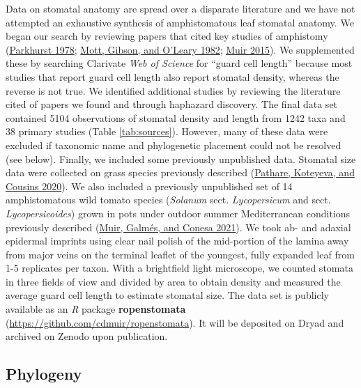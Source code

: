 \documentclass[
  10pt,
]{article}
\begin{document}
Data on stomatal anatomy are spread over a disparate literature and we have not attempted an exhaustive synthesis of amphistomatous leaf stomatal anatomy. We began our search by reviewing papers that cited key studies of amphistomy (\protect\hyperlink{ref-parkhurst_adaptive_1978}{Parkhurst 1978}; \protect\hyperlink{ref-mott_adaptive_1982}{Mott, Gibson, and O'Leary 1982}; \protect\hyperlink{ref-muir_making_2015}{Muir 2015}). We supplemented these by searching Clarivate \emph{Web of Science} for ``guard cell length'' because most studies that report guard cell length also report stomatal density, whereas the reverse is not true. We identified additional studies by reviewing the literature cited of papers we found and through haphazard discovery. The final data set contained 5104 observations of stomatal density and length from 1242 taxa and 38 primary studies (Table \ref{tab:sources}). However, many of these data were excluded if taxonomic name and phylogenetic placement could not be resolved (see below). Finally, we included some previously unpublished data. Stomatal size data were collected on grass species previously described (\protect\hyperlink{ref-pathare_increased_2020}{Pathare, Koteyeva, and Cousins 2020}). We also included a previously unpublished set of 14 amphistomatous wild tomato species (\emph{Solanum} sect. \emph{Lycopersicum} and sect. \emph{Lycopersicoides}) grown in pots under outdoor summer Mediterranean conditions previously described (\protect\hyperlink{ref-muir_unpublished_2021}{Muir, Galmés, and Conesa 2021}). We took ab- and adaxial epidermal imprints using clear nail polish of the mid-portion of the lamina away from major veins on the terminal leaflet of the youngest, fully expanded leaf from 1-5 replicates per taxon. With a brightfield light microscope, we counted stomata in three fields of view and divided by area to obtain density and measured the average guard cell length to estimate stomatal size. The data set is publicly available as an \emph{R} package \textbf{ropenstomata} (\url{https://github.com/cdmuir/ropenstomata}). It will be deposited on Dryad and archived on Zenodo upon publication.

\hypertarget{phylogeny}{%
\subsection{Phylogeny}\label{phylogeny}}
\end{document}
